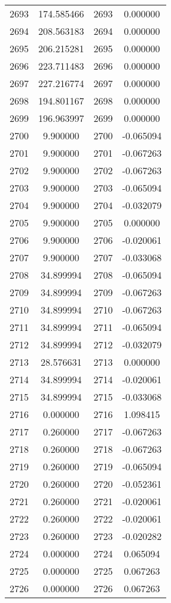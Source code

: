 \documentclass[12pt]{article}
\begin{document}
\begin{longtable}{@{}cccc@{}}
2693 & 174.585466 & 2693 & 0.000000 \\
2694 & 208.563183 & 2694 & 0.000000 \\
2695 & 206.215281 & 2695 & 0.000000 \\
2696 & 223.711483 & 2696 & 0.000000 \\
2697 & 227.216774 & 2697 & 0.000000 \\
2698 & 194.801167 & 2698 & 0.000000 \\
2699 & 196.963997 & 2699 & 0.000000 \\
2700 & 9.900000 & 2700 & -0.065094 \\
2701 & 9.900000 & 2701 & -0.067263 \\
2702 & 9.900000 & 2702 & -0.067263 \\
2703 & 9.900000 & 2703 & -0.065094 \\
2704 & 9.900000 & 2704 & -0.032079 \\
2705 & 9.900000 & 2705 & 0.000000 \\
2706 & 9.900000 & 2706 & -0.020061 \\
2707 & 9.900000 & 2707 & -0.033068 \\
2708 & 34.899994 & 2708 & -0.065094 \\
2709 & 34.899994 & 2709 & -0.067263 \\
2710 & 34.899994 & 2710 & -0.067263 \\
2711 & 34.899994 & 2711 & -0.065094 \\
2712 & 34.899994 & 2712 & -0.032079 \\
2713 & 28.576631 & 2713 & 0.000000 \\
2714 & 34.899994 & 2714 & -0.020061 \\
2715 & 34.899994 & 2715 & -0.033068 \\
2716 & 0.000000 & 2716 & 1.098415 \\
2717 & 0.260000 & 2717 & -0.067263 \\
2718 & 0.260000 & 2718 & -0.067263 \\
2719 & 0.260000 & 2719 & -0.065094 \\
2720 & 0.260000 & 2720 & -0.052361 \\
2721 & 0.260000 & 2721 & -0.020061 \\
2722 & 0.260000 & 2722 & -0.020061 \\
2723 & 0.260000 & 2723 & -0.020282 \\
2724 & 0.000000 & 2724 & 0.065094 \\
2725 & 0.000000 & 2725 & 0.067263 \\
2726 & 0.000000 & 2726 & 0.067263 \\

\end{longtable}
\end{document}
